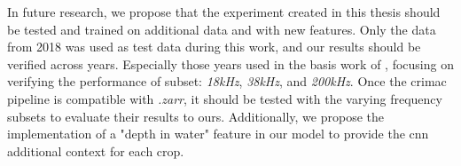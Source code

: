    
    In future research, we propose that the experiment created in this thesis should be tested and trained on additional data and with new features. Only the data from 2018 was used as test data during this work, and our results should be verified across years. Especially those years used in the basis work of \citeauthor{brautaset2020acoustic}, focusing on verifying the performance of subset: \textit{18kHz}, \textit{38kHz}, and \textit{200kHz}.  Once the \gls{crimac} pipeline is compatible with \textit{.zarr}, it should be tested with the varying frequency subsets to evaluate their results to ours. Additionally, we propose the implementation of a "depth in water" feature in our model to provide the \gls{cnn} additional context for each crop.
    
    
    
 